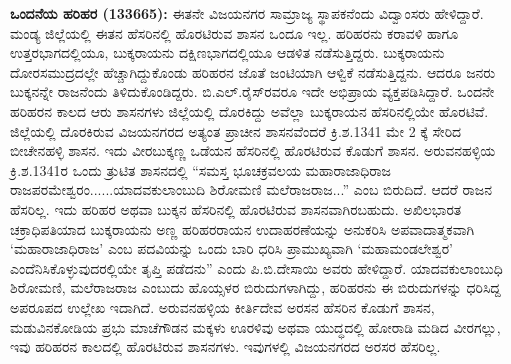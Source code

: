 \textbf{ ಒಂದನೆಯ ಹರಿಹರ (1336\general{\enginline{-}}65):} ಈತನೇ ವಿಜಯನಗರ ಸಾಮ್ರಾಜ್ಯ ಸ್ಥಾಪಕನೆಂದು ವಿದ್ವಾಂಸರು ಹೇಳಿದ್ದಾರೆ. ಮಂಡ್ಯ ಜಿಲ್ಲೆಯಲ್ಲಿ ಈತನ ಹೆಸರಿನಲ್ಲಿ ಹೊರಟಿರುವ ಶಾಸನ ಒಂದೂ ಇಲ್ಲ. ಹರಿಹರನು ಕರಾವಳಿ ಹಾಗೂ ಉತ್ತರಭಾಗದಲ್ಲಿಯೂ, ಬುಕ್ಕರಾಯನು ದಕ್ಷಿಣಭಾಗದಲ್ಲಿಯೂ ಆಡಳಿತ ನಡೆಸುತ್ತಿದ್ದರು. ಬುಕ್ಕರಾಯನು ದೋರಸಮುದ್ರದಲ್ಲೇ ಹೆಚ್ಚಾಗಿದ್ದುಕೊಂಡು ಹರಿಹರನ ಜೊತೆ ಜಂಟಿಯಾಗಿ ಆಳ್ವಿಕೆ ನಡೆಸುತ್ತಿದ್ದನು. ಆದರೂ ಜನರು ಬುಕ್ಕನನ್ನೇ ರಾಜನೆಂದು ತಿಳಿದುಕೊಂಡಿದ್ದರು. ಬಿ.ಎಲ್​.ರೈಸ್​ರವರೂ ಇದೇ ಅಭಿಪ್ರಾಯ ವ್ಯಕ್ತಪಡಿಸಿದ್ದಾರೆ. ಒಂದನೇ ಹರಿಹರನ ಕಾಲದ ಆರು ಶಾಸನಗಳು ಜಿಲ್ಲೆಯಲ್ಲಿ ದೊರಕಿದ್ದು ಅವೆಲ್ಲಾ ಬುಕ್ಕರಾಯನ ಹೆಸರಿನಲ್ಲಿಯೇ ಹೊರಟಿವೆ. ಜಿಲ್ಲೆಯಲ್ಲಿ ದೊರಕಿರುವ ವಿಜಯನಗರದ ಅತ್ಯಂತ ಪ್ರಾಚೀನ ಶಾಸನವೆಂದರೆ ಕ್ರಿ.ಶ.1341 ಮೇ 2 ಕ್ಕೆ ಸೇರಿದ ಬೀಚೇನಹಳ್ಳಿ ಶಾಸನ. ಇದು ವೀರಬುಕ್ಕಣ್ಣ ಒಡೆಯನ ಹೆಸರಿನಲ್ಲಿ ಹೊರಟಿರುವ ಕೊಡುಗೆ ಶಾಸನ. ಅರುವನಹಳ್ಳಿಯ ಕ್ರಿ.ಶ.1341ರ ಒಂದು ತ್ರುಟಿತ ಶಾಸನದಲ್ಲಿ “ಸಮಸ್ತ ಭೂಚಕ್ರವಲಯ ಮಹಾರಾಜಾಧಿರಾಜ ರಾಜಪರಮೇಶ್ವರಂ......ಯಾದವಕುಲಾಂಬುದಿ ಶಿರೋಮಣಿ ಮಲೆರಾಜರಾಜ...” ಎಂಬ ಬಿರುದಿದೆ. ಆದರೆ ರಾಜನ ಹೆಸರಿಲ್ಲ. ಇದು ಹರಿಹರ ಅಥವಾ ಬುಕ್ಕನ ಹೆಸರಿನಲ್ಲಿ ಹೊರಟಿರುವ ಶಾಸನವಾಗಿರಬಹುದು. ಅಖಿಲಭಾರತ ಚಕ್ರಾಧಿಪತಿಯಾದ ಬುಕ್ಕರಾಯನು ಅಣ್ಣ ಹರಿಹರರಾಯನ ಉದಾಹರಣೆಯನ್ನು ಅನುಕರಿಸಿ ಅಪವಾದಾತ್ಮಕವಾಗಿ `ಮಹಾರಾಜಾಧಿರಾಜ’ ಎಂಬ ಪದವಿಯನ್ನು ಒಂದು ಬಾರಿ ಧರಿಸಿ ಪ್ರಾಮುಖ್ಯವಾಗಿ ‘ಮಹಾಮಂಡಲೇಶ್ವರ’ ಎಂದೆನಿಸಿಕೊಳ್ಳು\-ವುದರಲ್ಲಿಯೇ ತೃಪ್ತಿ ಪಡೆದನು” ಎಂದು ಪಿ.ಬಿ.ದೇಸಾಯಿ ಅವರು ಹೇಳಿದ್ದಾರೆ. ಯಾದವಕುಲಾಂಬುಧಿ ಶಿರೋಮಣಿ, ಮಲೆರಾಜರಾಜ ಎಂಬುದು ಹೊಯ್ಸಳರ ಬಿರುದುಗಳಾಗಿದ್ದು, ಹರಿಹರನು ಈ ಬಿರುದುಗಳನ್ನು ಧರಿಸಿದ್ದ ಅಪರೂಪದ ಉಲ್ಲೇಖ ಇದಾಗಿದೆ. ಅರುವನಹಳ್ಳಿಯ ಕೀರ್ತಿದೇವ ಅರಸನ ಹೆಸರಿನ ಕೊಡುಗೆ ಶಾಸನ, ಮಡುವಿನಕೋಡಿಯ ಪ್ರಭು ಮಾಚೆಗೌಡನ ಮಕ್ಕಳು ಊರಳಿವು ಅಥವಾ ಯುದ್ಧದಲ್ಲಿ ಹೋರಾಡಿ ಮಡಿದ ವೀರಗಲ್ಲು, ಇವು ಹರಿಹರನ ಕಾಲದಲ್ಲಿ ಹೊರಟಿರುವ ಶಾಸನಗಳು. ಇವುಗಳಲ್ಲಿ ವಿಜಯನಗರದ ಅರಸರ ಹೆಸರಿಲ್ಲ.

